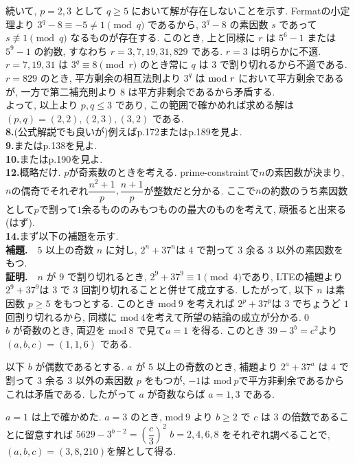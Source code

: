 \documentclass{ltjsarticle}
\theoremstyle{definition}
\begin{document}
\indent 続いて, $p=2,3$ として $q\geq 5$ において解が存在しないことを示す. Fermatの小定理より $3^q-8\equiv -5\neq 1 \pmod q$ であるから, $3^q-8$ の素因数 $s$ であって $s\not\equiv 1\pmod q$ なるものが存在する. このとき, 上と同様に $r$ は $5^6-1$ または $5^9-1$ の約数, すなわち $r=3,7,19,31,829$ である. $r=3$ は明らかに不適. $r=7,19,31$ は $3^q\equiv 8\pmod r$ のとき常に $q$ は $3$ で割り切れるから不適である. $r=829$ のとき, 平方剰余の相互法則より $3^q$ は ${\rm mod}\ r$ において平方剰余であるが, 一方で第二補充則より $8$ は平方非剰余であるから矛盾する.\\
\indent よって, 以上より $p,q\leq 3$ であり, この範囲で確かめれば求める解は $(p,q)=(2,2),(2,3),(3,2)$ である.\\
\textbf{8.}(公式解説でも良いが)例えば\cite{獲得}p.172または\cite{精選}p.189を見よ.\\
\textbf{9.}\cite{冪乗}または\cite{精選}p.138を見よ.\\
\textbf{10.}\cite{冪乗}または\cite{精選}p.190を見よ.\\
\textbf{12.}概略だけ. $p$が奇素数のときを考える. prime-constraintで$n$の素因数が決まり, $n$の偶奇でそれぞれ$\dfrac{n^2+1}p, \dfrac{n+1}p$が整数だと分かる. ここで$n$の約数のうち素因数として$p$で割って$1$余るもののみもつものの最大のものを考えて, 頑張ると出来る(はず).\\
\textbf{14.}まず以下の補題を示す.\\
\textbf{補題.}　$5$ 以上の奇数 $n$ に対し, $2^n+37^n$は $4$ で割って $3$ 余る $3$ 以外の素因数をもつ.\\
\textbf{証明.}　$n$ が $9$ で割り切れるとき, $2^9+37^9\equiv 1\pmod{4}$であり, LTEの補題より $2^9+37^9$は $3$ で $3$ 回割り切れることと併せて成立する. したがって, 以下 $n$ は素因数 $p\geq 5$ をもつとする. このとき $\textrm{mod}\ 9$ を考えれば $2^p+37^p$は $3$ でちょうど $1$ 回割り切れるから, 同様に $\textrm{mod}\ 4$を考えて所望の結論の成立が分かる.\qed\\

$b$ が奇数のとき, 両辺を $\textrm{mod} ~ 8$ で見て$ a=1$ を得る. このとき $39-3^b=c^2$より $(a,b,c)=(1,1,6)$ である.

以下 $b$ が偶数であるとする. $a$ が $5$ 以上の奇数のとき, 補題より $2^a+37^a$ は $4$ で割って $3$ 余る $3$ 以外の素因数 $p$ をもつが, $-1$は $\textrm{mod}~p$で平方非剰余であるからこれは矛盾である. したがって $a$ が奇数ならば $a=1,3$ である.

$a=1$ は上で確かめた. $a=3$ のとき, $\textrm{mod} ~ 9$ より $b\geq 2$ で $c$ は $3$ の倍数であることに留意すれば
$5629-3^{b-2}=\left(\dfrac{c}{3}\right)^2$
$b=2,4,6,8$ をそれぞれ調べることで, $(a,b,c)=(3,8,210)$を解として得る.
\end{document}
